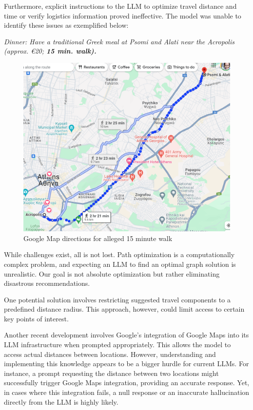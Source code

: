 \documentclass[12pt,a4paper]{report}
\begin{document}
Furthermore, explicit instructions to the LLM to optimize travel distance and time or verify logistics information proved ineffective. The model was unable to identify these issues as exemplified below:

\textit{Dinner: Have a traditional Greek meal at Psomi and Alati near the Acropolis (approx. €20; \textbf{15 min. walk).}}

\begin{figure}[H]
    \centering
    \includegraphics[scale=.55]{mapfail}
    \caption{Google Map directions for alleged 15 minute walk}
\end{figure}

While challenges exist, all is not lost. Path optimization is a computationally complex problem, and expecting an LLM to find an optimal graph solution is unrealistic. Our goal is not absolute optimization but rather eliminating disastrous recommendations.

One potential solution involves restricting suggested travel components to a predefined distance radius. This approach, however, could limit access to certain key points of interest.

Another recent development involves Google's integration of Google Maps into its LLM infrastructure when prompted appropriately. This allows the model to access actual distances between locations. However, understanding and implementing this knowledge appears to be a bigger hurdle for current LLMs. For instance, a prompt requesting the distance between two locations might successfully trigger Google Maps integration, providing an accurate response. Yet, in cases where this integration fails, a null response or an inaccurate hallucination directly from the LLM is highly likely.
\end{document}
